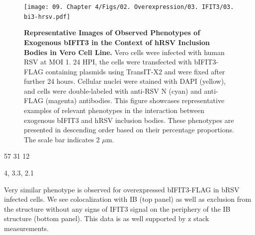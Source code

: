 \begin{figure}
    \centering
    \texttt{[image: 09. Chapter 4/Figs/02. Overexpression/03. IFIT3/03. bi3-hrsv.pdf]}
    \caption[Representative Images of Observed Phenotypes of Exogenous bIFIT3 in the Context of hRSV Inclusion Bodies in Vero Cell Line.]{\textbf{Representative Images of Observed Phenotypes of Exogenous bIFIT3 in the Context of hRSV Inclusion Bodies in Vero Cell Line.} Vero cells were infected with human RSV at MOI 1. 24 HPI, the cells were transfected with bIFIT3-FLAG containing plasmids using TransIT-X2 and were fixed after further 24 hours. Cellular nuclei were stained with DAPI (yellow), and cells were double-labeled with anti-RSV N (cyan) and anti-FLAG (magenta) antibodies. This figure showcases representative examples of relevant phenotypes in the interaction between exogenous bIFIT3 and hRSV inclusion bodies. These phenotypes are presented in descending order based on their percentage proportions. The scale bar indicates 2 \(\mu \mbox{m}\).}
    \label{fig:Representative Images of Observed Phenotypes of Exogenous bIFIT3 in the Context of hRSV Inclusion Bodies in VERO Cell Line}
\end{figure}

57 31 12

4, 3.3, 2.1

Very similar phenotype is observed for overexpressed bIFIT3-FLAG in bRSV infected cells. We see colocalization with IB (top panel) as well as exclusion from the structure without any signs of IFIT3 signal on the periphery of the IB structure (bottom panel). This data is as well supported by z stack measurements.

